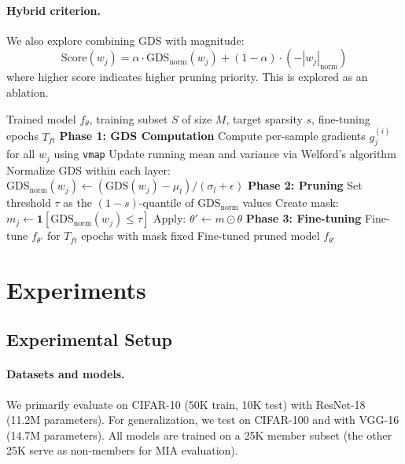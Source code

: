 \documentclass{article}
\newcommand{\gds}{\text{GDS}}
\newcommand{\gdsnorm}{\text{GDS}_{\text{norm}}}
\begin{document}
\paragraph{Hybrid criterion.} We also explore combining GDS with magnitude:
\begin{equation}
    \text{Score}(w_j) = \alpha \cdot \gdsnorm(w_j) + (1 - \alpha) \cdot (-|w_j|_{\text{norm}})
    \label{eq:hybrid}
\end{equation}
where higher score indicates higher pruning priority. This is explored as an ablation.

\begin{algorithm}[t]
\caption{MemPrune}
\label{alg:memprune}
\begin{algorithmic}[1]
\REQUIRE Trained model $f_\theta$, training subset $S$ of size $M$, target sparsity $s$, fine-tuning epochs $T_{ft}$
\STATE \textbf{Phase 1: GDS Computation}
    \STATE Compute per-sample gradients $g_j^{(i)}$ for all $w_j$ using \texttt{vmap}
    \STATE Update running mean and variance via Welford's algorithm
\ENDFOR
\STATE Normalize GDS within each layer: $\gdsnorm(w_j) \leftarrow ({\gds(w_j) - \mu_l})/({\sigma_l + \epsilon})$
\STATE \textbf{Phase 2: Pruning}
\STATE Set threshold $\tau$ as the $(1-s)$-quantile of $\gdsnorm$ values
\STATE Create mask: $m_j \leftarrow \mathbf{1}[\gdsnorm(w_j) \leq \tau]$
\STATE Apply: $\theta' \leftarrow m \odot \theta$
\STATE \textbf{Phase 3: Fine-tuning}
\STATE Fine-tune $f_{\theta'}$ for $T_{ft}$ epochs with mask fixed
\RETURN Fine-tuned pruned model $f_{\theta'}$
\end{algorithmic}
\end{algorithm}

\section{Experiments}
\label{sec:experiments}

\subsection{Experimental Setup}

\paragraph{Datasets and models.} We primarily evaluate on CIFAR-10 (50K train, 10K test) with ResNet-18 (11.2M parameters). For generalization, we test on CIFAR-100 and with VGG-16 (14.7M parameters). All models are trained on a 25K member subset (the other 25K serve as non-members for MIA evaluation).
\end{document}
